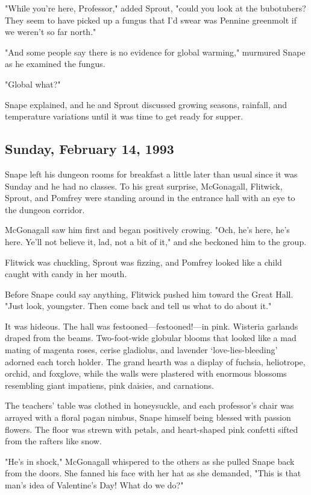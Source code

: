 "While you're here, Professor," added Sprout, "could you look at the bubotubers? They seem to have picked up a fungus that I'd swear was Pennine greenmolt if we weren't so far north."

"And some people say there is no evidence for global warming," murmured Snape as he examined the fungus.

"Global what?"

Snape explained, and he and Sprout discussed growing seasons, rainfall, and temperature variations until it was time to get ready for supper.

\subsection{Sunday, February 14, 1993} %

Snape left his dungeon rooms for breakfast a little later than usual since it was Sunday and he had no classes. To his great surprise, McGonagall, Flitwick, Sprout, and Pomfrey were standing around in the entrance hall with an eye to the dungeon corridor.

McGonagall saw him first and began positively crowing. "Och, he's here, he's here. Ye'll not believe it, lad, not a bit of it," and she beckoned him to the group.

Flitwick was chuckling, Sprout was fizzing, and Pomfrey looked like a child caught with candy in her mouth.

Before Snape could say anything, Flitwick pushed him toward the Great Hall. "Just look, youngster. Then come back and tell us what to do about it."

It was hideous. The hall was festooned—festooned!—in pink. Wisteria garlands draped from the beams. Two-foot-wide globular blooms that looked like a mad mating of magenta roses, cerise gladiolus, and lavender `love-lies-bleeding' adorned each torch holder. The grand hearth was a display of fuchsia, heliotrope, orchid, and foxglove, while the walls were plastered with enormous blossoms resembling giant impatiens, pink daisies, and carnations.

The teachers' table was clothed in honeysuckle, and each professor's chair was arrayed with a floral pagan nimbus, Snape himself being blessed with passion flowers. The floor was strewn with petals, and heart-shaped pink confetti sifted from the rafters like snow.

"He's in shock," McGonagall whispered to the others as she pulled Snape back from the doors. She fanned his face with her hat as she demanded, "This is that man's idea of Valentine's Day! What do we do?"

